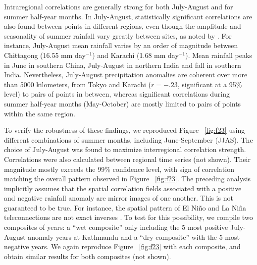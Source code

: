 	Intraregional correlations are generally strong for both July-August and for summer half-year months. In July-August, statistically significant correlations are also found between points in different regions, even though the amplitude and seasonality of summer rainfall vary greatly between sites, as noted by \cite{Wang2002}. For instance, July-August mean rainfall varies by an order of magnitude between Chittagong (16.55 mm day$^{-1}$) and Karachi (1.68 mm day$^{-1}$). Mean rainfall peaks in June in southern China, July-August in northern India and fall in southern India. Nevertheless, July-August precipitation anomalies are coherent over more than 5000 kilometers, from Tokyo and Karachi ($r=-.23$, significant at a 95\% level) to pairs of points in between, whereas significant correlations during summer half-year months (May-October) are mostly limited to pairs of points within the same region.
	
	  To verify the robustness of these findings, we reproduced Figure ~\ref{fig:f23} using different combinations of summer months, including June-September (JJAS). The choice of July-August was found to maximize interregional correlation strength. Correlations were also calculated between regional time series (not shown). Their magnitude mostly exceeds the 99\% confidence level, with sign of correlation matching the overall pattern observed in Figure ~\ref{fig:f23}. The preceding analysis implicitly assumes that the spatial correlation fields associated with a positive and negative rainfall anomaly are mirror images of one another. This is not guaranteed to be true. For instance, the spatial pattern of El Ni\~no and La Ni\~na teleconnections are not exact inverses \citep{Hoerling1997}. To test for this possibility, we compile two composites of years: a ``wet composite'' only including the 5 most positive July-August anomaly years at Kathmandu and a ``dry composite'' with the 5 most negative years. We again reproduce Figure ~\ref{fig:f23} with each composite, and obtain similar results for both composites (not shown).				
	  	
